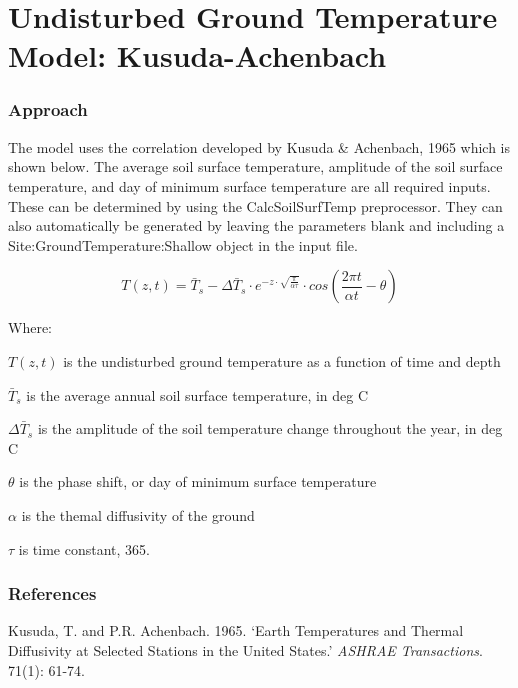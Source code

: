 \section{Undisturbed Ground Temperature Model: Kusuda-Achenbach}\label{undisturbed-ground-temperature-model-kusuda-achenbach}

\subsubsection{Approach}\label{approach-004}

The model uses the correlation developed by Kusuda \& Achenbach, 1965 which is shown below. The average soil surface temperature, amplitude of the soil surface temperature, and day of minimum surface temperature are all required inputs. These can be determined by using the CalcSoilSurfTemp preprocessor. They can also automatically be generated by leaving the parameters blank and including a Site:GroundTemperature:Shallow object in the input file.

\begin{equation}
T(z,t) = \bar{T}_{s} - \Delta\bar{T}_{s} \cdot e^{-z \cdot \sqrt{\frac{\pi}{\alpha\tau}}} \cdot cos\left( \frac{2\pi t}{\alpha t} - \theta \right)
\end{equation}

Where:

\(T(z,t)\) is the undisturbed ground temperature as a function of time and depth

\(\bar{T}_{s}\) is the average annual soil surface temperature, in deg C

\(\Delta\bar{T}_{s}\) is the amplitude of the soil temperature change throughout the year, in deg C

\(\theta\) is the phase shift, or day of minimum surface temperature

\(\alpha\) is the themal diffusivity of the ground

\(\tau\) is time constant, 365.

\subsubsection{References}\label{references-049}

Kusuda, T. and P.R. Achenbach. 1965. `Earth Temperatures and Thermal Diffusivity at Selected Stations in the United States.' \emph{ASHRAE Transactions}. 71(1): 61-74.
